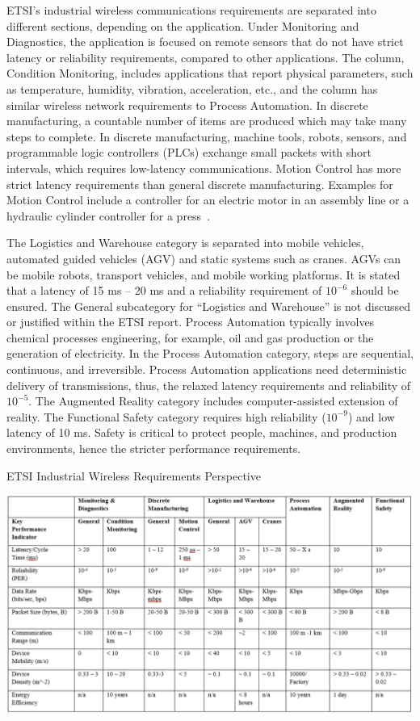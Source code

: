 ETSI’s industrial wireless communications requirements are separated into different sections, depending on the application. Under Monitoring and Diagnostics, the application is focused on remote sensors that do not have strict latency or reliability requirements, compared to other applications. The column, Condition Monitoring, includes applications that report physical parameters, such as temperature, humidity, vibration, acceleration, etc., and the column has similar wireless network requirements to Process Automation. In discrete manufacturing, a countable number of items are produced which may take many steps to complete. In discrete manufacturing, machine tools, robots, sensors, and programmable logic controllers (PLCs) exchange small packets with short intervals, which requires low-latency communications. Motion Control has more strict latency requirements than general discrete manufacturing. Examples for Motion Control include a controller for an electric motor in an assembly line or a hydraulic cylinder controller for a press~\cite{etsi103588}.

The Logistics and Warehouse category is separated into mobile vehicles, automated guided vehicles (AGV) and static systems such as cranes. AGVs can be mobile robots, transport vehicles, and mobile working platforms. It is stated that a latency of 15 ms – 20 ms and a reliability requirement of $10^{-6}$ should be ensured. The General subcategory for “Logistics and Warehouse” is not discussed or justified within the ETSI report. Process Automation typically involves chemical processes engineering, for example, oil and gas production or the generation of electricity. In the Process Automation category, steps are sequential, continuous, and irreversible. Process Automation applications need deterministic delivery of transmissions, thus, the relaxed latency requirements and reliability of $10^{-5}$. The Augmented Reality category includes computer-assisted extension of reality. The Functional Safety category requires high reliability ($10^{-9}$) and low latency of 10 ms. Safety is critical to protect people, machines, and production environments, hence the stricter performance requirements. 

\begin{table}[!tb]
	\centering
	\caption{ETSI Industrial Wireless Requirements Perspective}
	\label{soa:ets-reqts-persp}	
	\includegraphics[width=\textwidth]{chapter-soa/etsi-reqts}
\end{table}

